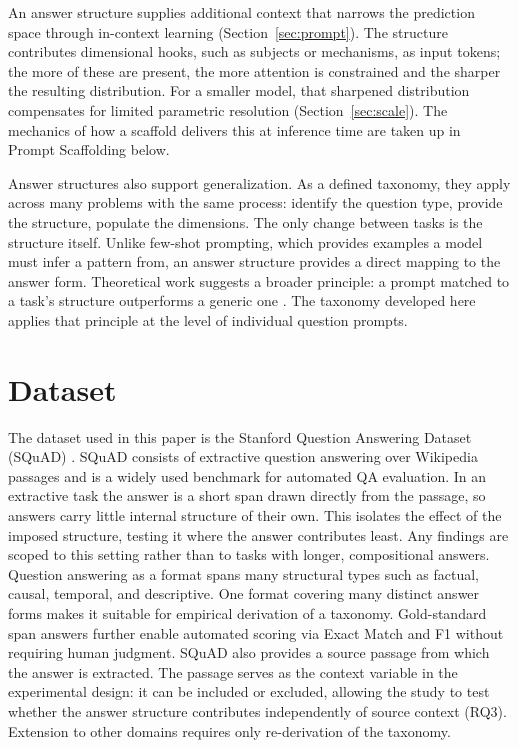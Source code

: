 \documentclass[master]{thesis}
\newcommand{\sref}[1]{Section~\ref{#1}}  %
\begin{document}
An answer structure supplies additional context that narrows the prediction space through in-context learning (\sref{sec:prompt}). The structure contributes dimensional hooks, such as subjects or mechanisms, as input tokens; the more of these are present, the more attention is constrained and the sharper the resulting distribution. For a smaller model, that sharpened distribution compensates for limited parametric resolution (\sref{sec:scale}). The mechanics of how a scaffold delivers this at inference time are taken up in Prompt Scaffolding below.

Answer structures also support generalization. As a defined taxonomy, they apply across many problems with the same process: identify the question type, provide the structure, populate the dimensions. The only change between tasks is the structure itself. Unlike few-shot prompting, which provides examples a model must infer a pattern from, an answer structure provides a direct mapping to the answer form. Theoretical work suggests a broader principle: a prompt matched to a task's structure outperforms a generic one \cite{taskspecific_prompts2025}. The taxonomy developed here applies that principle at the level of individual question prompts.

\section{Dataset}

The dataset used in this paper is the Stanford Question Answering Dataset (SQuAD) \cite{rajpurkar2016squad}. SQuAD consists of extractive question answering over Wikipedia passages and is a widely used benchmark for automated QA evaluation. In an extractive task the answer is a short span drawn directly from the passage, so answers carry little internal structure of their own. This isolates the effect of the imposed structure, testing it where the answer contributes least. Any findings are scoped to this setting rather than to tasks with longer, compositional answers. Question answering as a format spans many structural types such as factual, causal, temporal, and descriptive. One format covering many distinct answer forms makes it suitable for empirical derivation of a taxonomy. Gold-standard span answers further enable automated scoring via Exact Match and F1 without requiring human judgment. SQuAD also provides a source passage from which the answer is extracted. The passage serves as the context variable in the experimental design: it can be included or excluded, allowing the study to test whether the answer structure contributes independently of source context (RQ3). Extension to other domains requires only re-derivation of the taxonomy.
\end{document}
